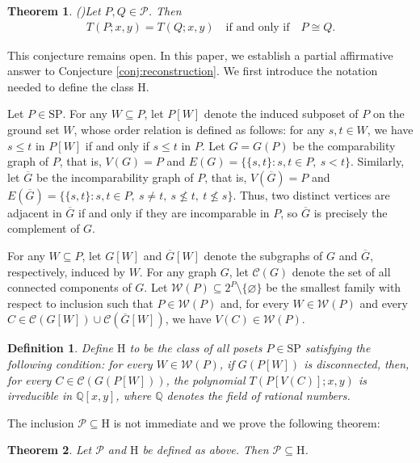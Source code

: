 \documentclass[10pt,a4paper]{amsart}
\newtheorem{theorem}{Theorem}[section]
\newtheorem{definition}{Definition}[section]
\begin{document}
\begin{theorem}(\cite{Gordon1996})\label{thm:theorem33-43}
Let $P,Q\in\mathcal{P}$. Then
\begin{eqnarray*}
T(P;x,y)=T(Q;x,y)\quad\text{if and only if}\quad P\cong Q.
\end{eqnarray*}
\end{theorem}

This conjecture remains open.
In this paper, we establish a partial affirmative answer to Conjecture \ref{conj:reconstruction}.
We first introduce the notation needed to define the class $\mathrm H$.

Let $P\in\mathrm{SP}$.
For any $W\subseteq P$, let $P[W]$ denote the induced subposet of $P$
on the ground set $W$, whose order relation is defined as follows:
for any $s,t\in W$, we have $s\le t$ in $P[W]$ if and only if $s\le t$ in $P$.
Let $G=G(P)$ be the comparability graph of $P$, that is,
$V(G)=P$ and $E(G)=\{\{s,t\}:s,t\in P,\ s<t\}$.
Similarly, let $\overline G$ be the incomparability graph of $P$,
that is, $V(\overline G)=P$ and $E(\overline G)=\{\{s,t\}:s,t\in P,\ s\neq t,\ s\nleq t,\ t\nleq s\}$.
Thus, two distinct vertices are adjacent in $\overline G$ if and only if they are incomparable in $P$,
so $\overline G$ is precisely the complement of $G$.

For any $W\subseteq P$, let $G[W]$ and $\overline G[W]$ denote 
the subgraphs of $G$ and $\overline G$, respectively, induced by $W$.
For any graph $G$, let $\mathcal C(G)$ denote the set of all connected components of $G$.
Let $\mathcal W(P)\subseteq 2^P\setminus\{\varnothing\}$
be the smallest family with respect to inclusion such that
$P\in\mathcal W(P)$ and, for every $W\in\mathcal W(P)$ and every
$C\in\mathcal C(G[W])\cup\mathcal C(\overline G[W])$, we have $V(C)\in\mathcal W(P)$.

\begin{definition}\label{def:poset-h}
Define $\mathrm H$ to be the class of all posets $P\in\mathrm{SP}$
satisfying the following condition:
for every $W\in\mathcal W(P)$, if $G(P[W])$ is disconnected,
then, for every $C\in\mathcal C(G(P[W]))$,
the polynomial $T(P[V(C)];x,y)$ is irreducible in $\mathbb Q[x,y]$,
where $\mathbb Q$ denotes the field of rational numbers.
\end{definition}

The inclusion $\mathcal P\subseteq\mathrm H$ is not immediate and we prove the following theorem:

\begin{theorem}\label{thm:main-sub}
Let $\mathcal P$ and $\mathrm H$ be defined as above.
Then $\mathcal P\subseteq\mathrm H$.
\end{theorem}
\end{document}
